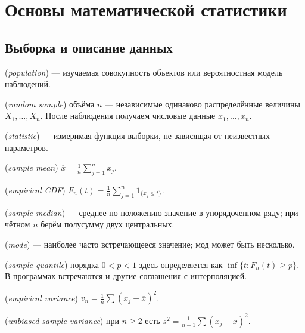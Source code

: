 \chapter{Основы математической статистики}\label{chap:statistics}

\section{Выборка и описание данных}
\begin{definition} (\emph{population}) — изучаемая совокупность объектов или вероятностная модель наблюдений. \par{} (\emph{random sample}) объёма \(n\) — независимые одинаково распределённые величины \(X_1,\ldots,X_n\). После наблюдения получаем числовые данные \(x_1,\ldots,x_n\).\end{definition}
\begin{definition} (\emph{statistic}) — измеримая функция выборки, не зависящая от неизвестных параметров. \par{} (\emph{sample mean}) \(\overline x=\frac1n\sum_{j=1}^n x_j\). \par{} (\emph{empirical CDF}) \(F_n(t)=\frac1n\sum_{j=1}^n1_{\{x_j\le t\}}\).\end{definition}
\begin{definition} (\emph{sample median}) — среднее по положению значение в упорядоченном ряду; при чётном \(n\) берём полусумму двух центральных. \par{} (\emph{mode}) — наиболее часто встречающееся значение; мод может быть несколько. \par{} (\emph{sample quantile}) порядка \(0<p<1\) здесь определяется как \(\inf\{t:F_n(t)\ge p\}\). В программах встречаются и другие соглашения с интерполяцией.\end{definition}
\begin{definition} (\emph{empirical variance}) \(v_n=\frac1n\sum(x_j-\overline x)^2\). \par{} (\emph{unbiased sample variance}) при \(n\ge2\) есть \(s^2=\frac1{n-1}\sum(x_j-\overline x)^2\).\end{definition}
